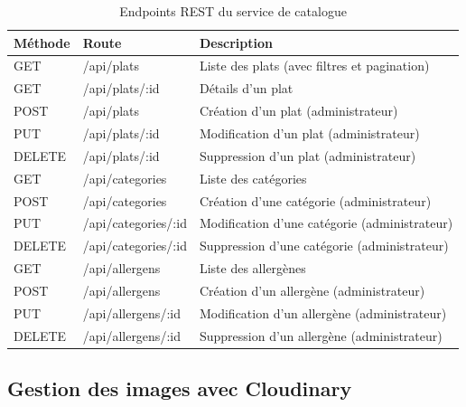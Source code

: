 \begin{table}[H]
    \centering
    \caption{Endpoints REST du service de catalogue}
    \label{tab:endpoints_catalog}
    \renewcommand{\arraystretch}{1.2}
    \begin{tabular}{|l|p{4.5cm}|p{5.5cm}|}
        \hline
        \textbf{Méthode} & \textbf{Route} & \textbf{Description} \\
        \hline
        GET & /api/plats & Liste des plats (avec filtres et pagination) \\
        \hline
        GET & /api/plats/:id & Détails d'un plat \\
        \hline
        POST & /api/plats & Création d'un plat (administrateur) \\
        \hline
        PUT & /api/plats/:id & Modification d'un plat (administrateur) \\
        \hline
        DELETE & /api/plats/:id & Suppression d'un plat (administrateur) \\
        \hline
        GET & /api/categories & Liste des catégories \\
        \hline
        POST & /api/categories & Création d'une catégorie (administrateur) \\
        \hline
        PUT & /api/categories/:id & Modification d'une catégorie (administrateur) \\
        \hline
        DELETE & /api/categories/:id & Suppression d'une catégorie (administrateur) \\
        \hline
        GET & /api/allergens & Liste des allergènes \\
        \hline
        POST & /api/allergens & Création d'un allergène (administrateur) \\
        \hline
        PUT & /api/allergens/:id & Modification d'un allergène (administrateur) \\
        \hline
        DELETE & /api/allergens/:id & Suppression d'un allergène (administrateur) \\
        \hline
    \end{tabular}
\end{table}




\subsection{Gestion des images avec Cloudinary}

